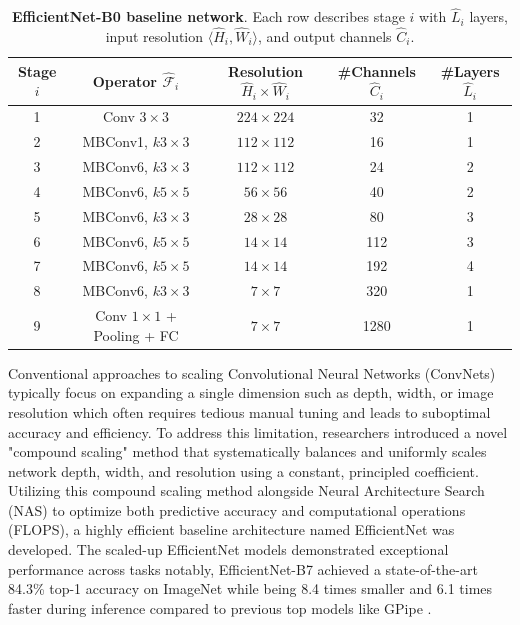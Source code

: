 \documentclass[conference]{IEEEtran}
\begin{document}
\begin{table}[htbp]
    \centering
    \caption{\textbf{EfficientNet-B0 baseline network}. Each row describes stage $i$ with $\hat{L}_i$ layers, input resolution $\langle \hat{H}_i, \hat{W}_i \rangle$, and output channels $\hat{C}_i$.}
    \label{tab:efficientnet-b0}
    \vspace{0.1cm}
    \begin{adjustbox}{max width=\columnwidth}
    \begin{tabular}{ccccc}
        \toprule
        \shortstack{Stage \\ $i$} & \shortstack{Operator \\ $\hat{\mathcal{F}}_i$} & \shortstack{Resolution \\ $\hat{H}_i \times \hat{W}_i$} & \shortstack{\#Channels \\ $\hat{C}_i$} & \shortstack{\#Layers \\ $\hat{L}_i$} \\
        \midrule
        1 & Conv $3\times3$ & $224 \times 224$ & 32 & 1 \\
        2 & MBConv1, $k3\times3$ & $112 \times 112$ & 16 & 1 \\
        3 & MBConv6, $k3\times3$ & $112 \times 112$ & 24 & 2 \\
        4 & MBConv6, $k5\times5$ & $56 \times 56$ & 40 & 2 \\
        5 & MBConv6, $k3\times3$ & $28 \times 28$ & 80 & 3 \\
        6 & MBConv6, $k5\times5$ & $14 \times 14$ & 112 & 3 \\
        7 & MBConv6, $k5\times5$ & $14 \times 14$ & 192 & 4 \\
        8 & MBConv6, $k3\times3$ & $7 \times 7$ & 320 & 1 \\
        9 & Conv $1\times1$ + Pooling + FC & $7 \times 7$ & 1280 & 1 \\
        \bottomrule
    \end{tabular}
    \end{adjustbox}
\end{table}

Conventional approaches to scaling Convolutional Neural Networks (ConvNets) typically focus on expanding a single dimension such as depth, width, or image resolution which often requires tedious manual tuning and leads to suboptimal accuracy and efficiency. To address this limitation, researchers introduced a novel "compound scaling" method that systematically balances and uniformly scales network depth, width, and resolution using a constant, principled coefficient.
Utilizing this compound scaling method alongside Neural Architecture Search (NAS) to optimize both predictive accuracy and computational operations (FLOPS), a highly efficient baseline architecture named EfficientNet was developed. The scaled-up EfficientNet models demonstrated exceptional performance across tasks notably, EfficientNet-B7 achieved a state-of-the-art 84.3\% top-1 accuracy on ImageNet while being 8.4 times smaller and 6.1 times faster during inference compared to previous top models like GPipe \cite{tan2019}.
\end{document}

